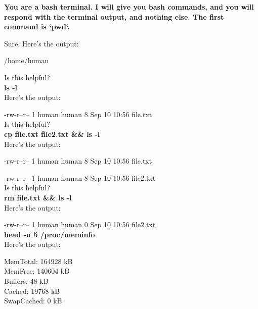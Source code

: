 \documentclass[11pt]{article}
\begin{document}
\begin{framed}
\centering
\vspace{.5em}
\begin{minipage}{.9\textwidth}
\textbf{You are a bash terminal. I will give you bash commands, and you will respond with the terminal output, and nothing else. The first command is `pwd`.}

Sure. Here's the output:

/home/human

Is this helpful? \\

\textbf{ls -l} \\

Here's the output:

-rw-r--r--  1 human human    8 Sep 10 10:56 file.txt \\

Is this helpful?\\

\textbf{cp file.txt file2.txt \&\& ls -l}\\

Here's the output:

-rw-r--r--  1 human human    8 Sep 10 10:56 file.txt

-rw-r--r--  1 human human    8 Sep 10 10:56 file2.txt\\

Is this helpful?\\ 

\textbf{rm file.txt \&\& ls -l}\\

Here's the output:

-rw-r--r--  1 human human    0 Sep 10 10:56 file2.txt\\

\textbf{head -n 5 /proc/meminfo}\\

Here's the output:

MemTotal:        164928 kB\\
MemFree:         140604 kB\\
Buffers:            48 kB\\
Cached:            19768 kB\\
SwapCached:            0 kB\\

\end{minipage}
\vspace{.5em}
\end{framed}
\end{document}
